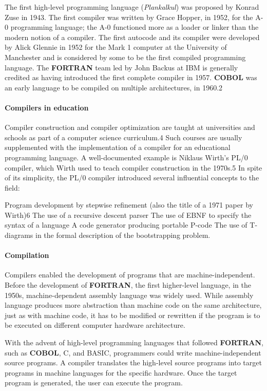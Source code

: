 \documentclass{article}
\begin{document}
The first high-level programming language (\textit{Plankalkul}) was proposed by Konrad Zuse in 1943. The first compiler was written by Grace Hopper, in 1952, for the A-0 programming language; the A-0 functioned more as a loader or linker than the modern notion of a compiler. The first autocode and its compiler were developed by Alick Glennie in 1952 for the Mark 1 computer at the University of Manchester and is considered by some to be the first compiled programming language. The \textbf{FORTRAN} team led by John Backus at IBM is generally credited as having introduced the first complete compiler in 1957. \textbf{COBOL} was an early language to be compiled on multiple architectures, in 1960.2

\paragraph{Compilers in education}
Compiler construction and compiler optimization are taught at universities and schools as part of a computer science curriculum.4 Such courses are usually supplemented with the implementation of a compiler for an educational programming language. A well-documented example is Niklaus Wirth's PL/0 compiler, which Wirth used to teach compiler construction in the 1970s.5 In spite of its simplicity, the PL/0 compiler introduced several influential concepts to the field:

    Program development by stepwise refinement (also the title of a 1971 paper by Wirth)6
    The use of a recursive descent parser
    The use of EBNF to specify the syntax of a language
    A code generator producing portable P-code
    The use of T-diagrams in the formal description of the bootstrapping problem.

\paragraph{Compilation}
Compilers enabled the development of programs that are machine-independent. Before the development of \textbf{FORTRAN}, the first higher-level language, in the 1950s, machine-dependent assembly language was widely used. While assembly language produces more abstraction than machine code on the same architecture, just as with machine code, it has to be modified or rewritten if the program is to be executed on different computer hardware architecture.

With the advent of high-level programming languages that followed \textbf{FORTRAN}, such as \textbf{COBOL}, C, and BASIC, programmers could write machine-independent source programs. A compiler translates the high-level source programs into target programs in machine languages for the specific hardware. Once the target program is generated, the user can execute the program.
\end{document}
